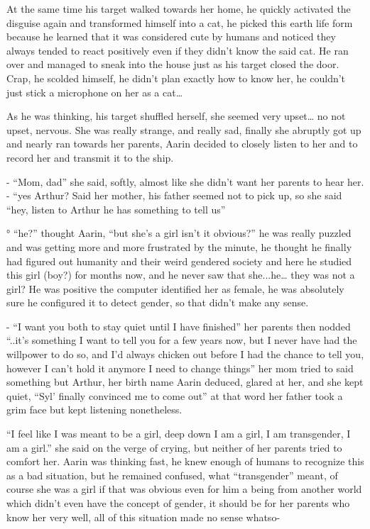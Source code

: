 \documentclass[hidelinks,12pt,a4paper]{book}
\begin{document}
At the same time his target walked towards her home, he quickly activated the disguise again and transformed 
himself into a cat, he picked this earth life form because he learned that it was considered cute by humans and 
noticed they always tended to react positively even if they didn't know the said cat. He ran over and managed to 
sneak into the house just as his target closed the door. Crap, he scolded himself, he didn't plan exactly how to 
know her, he couldn't just stick a microphone on her as a cat… \par
\bigskip

As he was thinking, his target shuffled herself, she seemed very upset… no not upset, nervous. 
She was really strange, and really sad, finally she abruptly got up and nearly ran towards her parents, 
Aarin decided to closely listen to her and to record her and transmit it to the ship.\par
\bigskip

- “Mom, dad” she said, softly, almost like she didn't want her parents to hear her.\newline
- “yes Arthur? Said her mother, his father seemed not to pick up, so she said
 “hey, listen to Arthur he has something to tell us”\newline

° “he?” thought Aarin, “but she's a girl isn't it obvious?” 
he was really puzzled and was getting more and more frustrated by the minute, 
he thought he finally had figured out humanity and their weird gendered society and 
here he studied this girl (boy?) for months now, and he never saw that she...he… 
they was not a girl? He was positive the computer identified her as female, he was absolutely sure 
he configured it to detect gender, so that didn't make any sense.\par
\bigskip

- “I want you both to stay quiet until I have finished” her parents then nodded 
“..it's something I want to tell you for a few years now, but I never have had the willpower to do so, 
and I'd always chicken out before I had the chance to tell you, however I can't hold it anymore I need to change things” 
her mom tried to said something but Arthur, her birth name Aarin deduced, glared at her, and she kept quiet, 
“Syl' finally convinced me to come out” at that word her father took a grim face but kept listening nonetheless.\newline

“I feel like I was meant to be a girl, deep down I am a girl, I am transgender, I am a girl.” she said on the verge of crying,
 but neither of her parents tried to comfort her. Aarin was thinking fast, 
 he knew enough of humans to recognize this as a bad situation, but he remained confused, what
  “transgender” meant, of course she was a girl if that was obvious even for him a being from another world which 
  didn't even have the concept of gender, it should be for her parents who know her very well, all of this situation 
  made no sense whatso-\par
  \bigskip
\end{document}

